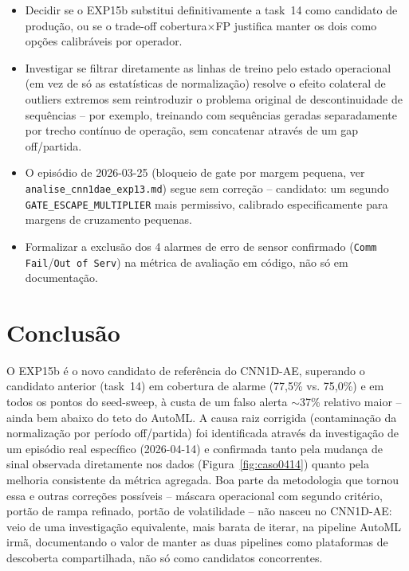 \documentclass[11pt,a4paper]{article}
\begin{document}
\begin{itemize}[leftmargin=1.4em]
  \item Decidir se o EXP15b substitui definitivamente a task~14 como
    candidato de produção, ou se o trade-off cobertura$\times$FP
    justifica manter os dois como opções calibráveis por operador.
  \item Investigar se filtrar diretamente as linhas de treino pelo
    estado operacional (em vez de só as estatísticas de normalização)
    resolve o efeito colateral de outliers extremos sem reintroduzir o
    problema original de descontinuidade de sequências -- por exemplo,
    treinando com sequências geradas separadamente por trecho contínuo
    de operação, sem concatenar através de um gap off/partida.
  \item O episódio de 2026-03-25 (bloqueio de gate por margem pequena,
    ver \texttt{analise\_cnn1dae\_exp13.md}) segue sem correção --
    candidato: um segundo \texttt{GATE\_ESCAPE\_MULTIPLIER} mais
    permissivo, calibrado especificamente para margens de cruzamento
    pequenas.
  \item Formalizar a exclusão dos 4 alarmes de erro de sensor
    confirmado (\texttt{Comm Fail}/\texttt{Out of Serv}) na métrica de
    avaliação em código, não só em documentação.
\end{itemize}

\section{Conclusão}

O EXP15b é o novo candidato de referência do CNN1D-AE, superando o
candidato anterior (task~14) em cobertura de alarme (77,5\% vs. 75,0\%)
e em todos os pontos do seed-sweep, à custa de um falso alerta
$\sim$37\% relativo maior -- ainda bem abaixo do teto do AutoML. A
causa raiz corrigida (contaminação da normalização por período
off/partida) foi identificada através da investigação de um episódio
real específico (2026-04-14) e confirmada tanto pela mudança de sinal
observada diretamente nos dados (Figura~\ref{fig:caso0414}) quanto pela
melhoria consistente da métrica agregada. Boa parte da metodologia que
tornou essa e outras correções possíveis -- máscara operacional com
segundo critério, portão de rampa refinado, portão de volatilidade --
não nasceu no CNN1D-AE: veio de uma investigação equivalente, mais
barata de iterar, na pipeline AutoML irmã, documentando o valor de
manter as duas pipelines como plataformas de descoberta compartilhada,
não só como candidatos concorrentes.
\end{document}
